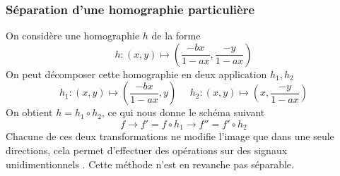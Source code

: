 \subsubsection{Séparation d'une homographie particulière }

On considère une homographie $h$ de la forme 
\begin{equation*}
h:(x,y)\mapsto \left(\frac{-bx}{1-ax},\frac{-y}{1-ax}\right)
\end{equation*}
On peut décomposer cette homographie en deux application $h_1 , h_2$
\begin{equation*}
h_1:(x,y) \mapsto \left(\frac{-bx}{1-ax}    ,y\right)~~~~~~h_2:(x,y) \mapsto \left(x,\frac{-y}{1-ax}\right)
\end{equation*}
On obtient $h=h_1  \circ h_2$, ce qui nous donne le schéma suivant 
\begin{equation*}
f\longrightarrow f'=f\circ h_1 \longrightarrow f''=f'\circ h_2
\end{equation*}
Chacune de ces deux transformations ne modifie l'image que dans une seule directions, cela permet d'effectuer des opérations sur des signaux unidimentionnels . Cette méthode n'est en revanche pas séparable.\\
